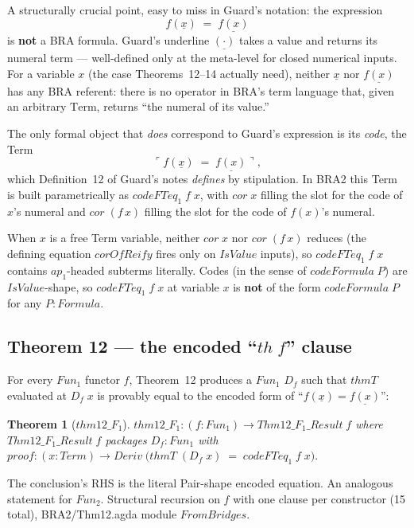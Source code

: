 \documentclass[11pt]{article}
\newtheorem{theorem}{Theorem}
\begin{document}
A structurally crucial point, easy to miss in Guard's notation: the
expression
\[
  f(\underline{x}) \;=\; \underline{f(x)}
\]
is \textbf{not} a BRA formula.  Guard's underline $\underline{(\cdot)}$
takes a value and returns its numeral term --- well-defined only at the
meta-level for closed numerical inputs.  For a variable $x$ (the case
Theorems~12--14 actually need), neither $\underline{x}$ nor
$\underline{f(x)}$ has any BRA referent: there is no operator in BRA's
term language that, given an arbitrary $\mathrm{Term}$, returns ``the
numeral of its value.''

The only formal object that \emph{does} correspond to Guard's
expression is its \emph{code}, the Term
\[
  \ulcorner f(\underline{x}) \;=\; \underline{f(x)} \urcorner,
\]
which Definition~12 of Guard's notes \emph{defines} by stipulation.  In
BRA2 this Term is built parametrically as $\mathit{codeFTeq}_1\;f\;x$,
with $\mathit{cor}\;x$ filling the slot for the code of $x$'s numeral
and $\mathit{cor}\;(f\,x)$ filling the slot for the code of $f(x)$'s
numeral.

When $x$ is a free Term variable, neither $\mathit{cor}\;x$ nor
$\mathit{cor}\;(f\,x)$ reduces (the defining equation
$\mathit{corOfReify}$ fires only on $\mathit{IsValue}$ inputs), so
$\mathit{codeFTeq}_1\;f\;x$ contains $\mathit{ap}_1$-headed subterms
literally.  Codes (in the sense of $\mathit{codeFormula}\;P$) are
$\mathit{IsValue}$-shape, so $\mathit{codeFTeq}_1\;f\;x$ at variable $x$
is \textbf{not} of the form $\mathit{codeFormula}\;P$ for any
$P : \mathit{Formula}$.

\subsection{Theorem 12 --- the encoded ``$\mathit{th}\;f$'' clause}

For every $\mathit{Fun}_1$ functor $f$, Theorem~12 produces a
$\mathit{Fun}_1$ $D_f$ such that $\mathit{thmT}$ evaluated at $D_f\;x$ is
provably equal to the encoded form of
``$f(\underline{x}) = \underline{f(x)}$'':

\begin{theorem}[$\mathit{thm12}\_F_1$]
\(
  \mathit{thm12}\_F_1 : (f : \mathit{Fun}_1) \to \mathit{Thm12\_F_1\_Result}\;f
\)
where $\mathit{Thm12\_F_1\_Result}\;f$ packages $D_f : \mathit{Fun}_1$ with
\(
  \mathit{proof} : (x : \mathit{Term}) \to
   \mathit{Deriv}\;\bigl(\mathit{thmT}\;(D_f\;x)
       \;=\; \mathit{codeFTeq}_1\;f\;x\bigr).
\)
\end{theorem}
The conclusion's RHS is the literal Pair-shape encoded equation.  An
analogous statement for $\mathit{Fun}_2$.  Structural recursion on $f$
with one clause per constructor (15 total),
BRA2/Thm12.agda module $\mathit{FromBridges}$.
\end{document}
